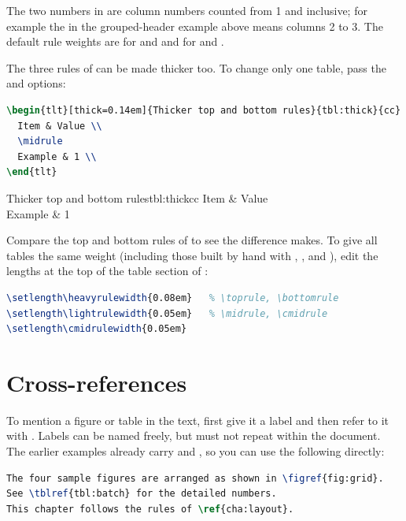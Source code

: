 The two numbers in  are column numbers counted from 1 and inclusive; for example the  in the grouped-header example above means columns 2 to 3. The default rule weights are \code{0.08em} for \code{\toprule} and \code{\bottomrule} and \code{0.05em} for \code{\midrule} and \code{\cmidrule}.

The three rules of  can be made thicker too. To change only one table, pass the  and  options:

\begin{lstlisting}[language=latex]
\begin{tlt}[thick=0.14em]{Thicker top and bottom rules}{tbl:thick}{cc}
  Item & Value \\
  \midrule
  Example & 1 \\
\end{tlt}
\end{lstlisting}

\begin{tlt}[thick=0.14em]{Thicker top and bottom rules}{tbl:thick}{cc}
  Item & Value \\
  \midrule
  Example & 1 \\
\end{tlt}

Compare the top and bottom rules of  to see the difference  makes. To give all tables the same weight (including those built by hand with \code{\toprule}, \code{\midrule}, \code{\bottomrule} and \code{\cmidrule}), edit the lengths at the top of the table section of :

\begin{lstlisting}[language=latex]
\setlength\heavyrulewidth{0.08em}   % \toprule, \bottomrule
\setlength\lightrulewidth{0.05em}   % \midrule, \cmidrule
\setlength\cmidrulewidth{0.05em}
\end{lstlisting}

\section{Cross-references}

To mention a figure or table in the text, first give it a label and then refer to it with \code{\ref}. Labels can be named freely, but must not repeat within the document. The earlier examples already carry  and , so you can use the following directly:

\begin{lstlisting}[language=latex]
The four sample figures are arranged as shown in \figref{fig:grid}.
See \tblref{tbl:batch} for the detailed numbers.
This chapter follows the rules of \ref{cha:layout}.
\end{lstlisting}

